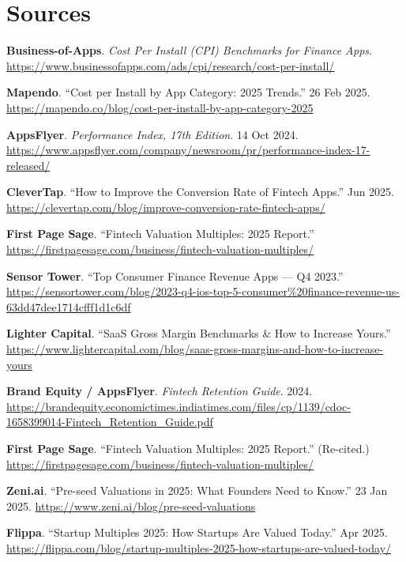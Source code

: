 \documentclass[11pt,letterpaper]{article}
\begin{document}
\section*{Sources}
\begin{enumerate}[label={[{\arabic*}]}]

\item \textbf{Business-of-Apps}. \textit{Cost Per Install (CPI) Benchmarks for Finance Apps}.  
      \url{https://www.businessofapps.com/ads/cpi/research/cost-per-install/}

\item \textbf{Mapendo}. ``Cost per Install by App Category: 2025 Trends.'' 26 Feb 2025.  
      \url{https://mapendo.co/blog/cost-per-install-by-app-category-2025}

\item \textbf{AppsFlyer}. \textit{Performance Index, 17th Edition}. 14 Oct 2024.  
      \url{https://www.appsflyer.com/company/newsroom/pr/performance-index-17-released/}

\item \textbf{CleverTap}. ``How to Improve the Conversion Rate of Fintech Apps.'' Jun 2025.  
      \url{https://clevertap.com/blog/improve-conversion-rate-fintech-apps/}

\item \textbf{First Page Sage}. ``Fintech Valuation Multiples: 2025 Report.''  
      \url{https://firstpagesage.com/business/fintech-valuation-multiples/}

\item \textbf{Sensor Tower}. ``Top Consumer Finance Revenue Apps --- Q4 2023.''  
      \url{https://sensortower.com/blog/2023-q4-ios-top-5-consumer%20finance-revenue-us-63dd47dee1714cfff1d1c6df}

\item \textbf{Lighter Capital}. ``SaaS Gross Margin Benchmarks \& How to Increase Yours.''  
      \url{https://www.lightercapital.com/blog/saas-gross-margins-and-how-to-increase-yours}

\item \textbf{Brand Equity / AppsFlyer}. \textit{Fintech Retention Guide}. 2024.  
      \url{https://brandequity.economictimes.indiatimes.com/files/cp/1139/cdoc-1658399014-Fintech_Retention_Guide.pdf}

\item \textbf{First Page Sage}. ``Fintech Valuation Multiples: 2025 Report.'' (Re-cited.)  
      \url{https://firstpagesage.com/business/fintech-valuation-multiples/}

\item \textbf{Zeni.ai}. ``Pre-seed Valuations in 2025: What Founders Need to Know.'' 23 Jan 2025.  
      \url{https://www.zeni.ai/blog/pre-seed-valuations}

\item \textbf{Flippa}. ``Startup Multiples 2025: How Startups Are Valued Today.'' Apr 2025.  
      \url{https://flippa.com/blog/startup-multiples-2025-how-startups-are-valued-today/}

\end{enumerate}
\end{document}
